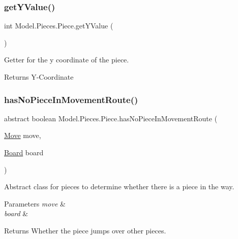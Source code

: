 \subsubsection{\texorpdfstring{get\+Y\+Value()}{getYValue()}}
{\footnotesize\ttfamily int Model.\+Pieces.\+Piece.\+get\+Y\+Value (\begin{DoxyParamCaption}{ }\end{DoxyParamCaption})}

Getter for the y coordinate of the piece. \begin{DoxyReturn}{Returns}
Y-\/\+Coordinate 
\end{DoxyReturn}
\hypertarget{class_model_1_1_pieces_1_1_piece_a2d3dddd5af8a3d813741d3f6f4e89e10}{}\label{class_model_1_1_pieces_1_1_piece_a2d3dddd5af8a3d813741d3f6f4e89e10} 
\subsubsection{\texorpdfstring{has\+No\+Piece\+In\+Movement\+Route()}{hasNoPieceInMovementRoute()}}
{\footnotesize\ttfamily abstract boolean Model.\+Pieces.\+Piece.\+has\+No\+Piece\+In\+Movement\+Route (\begin{DoxyParamCaption}\item[{\hyperlink{class_model_1_1_move}{Move}}]{move,  }\item[{\hyperlink{class_model_1_1_board}{Board}}]{board }\end{DoxyParamCaption})\hspace{0.3cm}{\ttfamily [abstract]}}

Abstract class for pieces to determine whether there is a piece in the way. 
\begin{DoxyParams}{Parameters}
{\em move} & \\
\hline
{\em board} & \\
\hline
\end{DoxyParams}
\begin{DoxyReturn}{Returns}
Whether the piece jumps over other pieces. 
\end{DoxyReturn}
\hypertarget{class_model_1_1_pieces_1_1_piece_a5415845a97251b8c8da29956769c4f3e}{}\label{class_model_1_1_pieces_1_1_piece_a5415845a97251b8c8da29956769c4f3e} 

